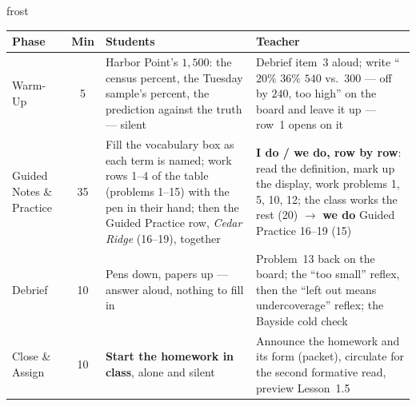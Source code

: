 \documentclass[10pt]{article}
\begin{document}
\begin{fixedskillbox}{frost}
\renewcommand{\arraystretch}{1.25}
\begin{tabularx}{\linewidth}{@{}l c X X@{}}
\textbf{Phase} & \textbf{Min} & \textbf{Students} & \textbf{Teacher} \\
\hline
Warm-Up & 5 & Harbor Point's $1{,}500$: the census percent, the Tuesday sample's percent, the
  prediction against the truth --- silent & Debrief item~3 aloud; write ``$20\%$ \; $36\%$ \;
  $540$ vs.\ $300$ --- off by $240$, too high'' on the board and leave it up --- row~1
  opens on it \\
Guided Notes \& Practice & 35 & Fill the vocabulary box as each term is named; work rows 1--4
  of the table (problems 1--15) with the pen in their hand; then the Guided Practice row,
  \emph{Cedar Ridge} (16--19), together & \textbf{I do / we do, row by row}: read the
  definition, mark up the display, work problems 1, 5, 10, 12; the class works the rest (20)
  $\to$ \textbf{we do} Guided Practice 16--19 (15) \\
Debrief & 10 & Pens down, papers up --- answer aloud, nothing to fill in & Problem~13 back on
  the board; the ``too small'' reflex, then the ``left out means undercoverage''
  reflex; the Bayside cold check \\
Close \& Assign & 10 & \textbf{Start the homework in class}, alone and silent & Announce the
  homework and its form (packet), circulate for the second formative read, preview
  Lesson~1.5 \\
\end{tabularx}
\end{fixedskillbox}
\end{document}
